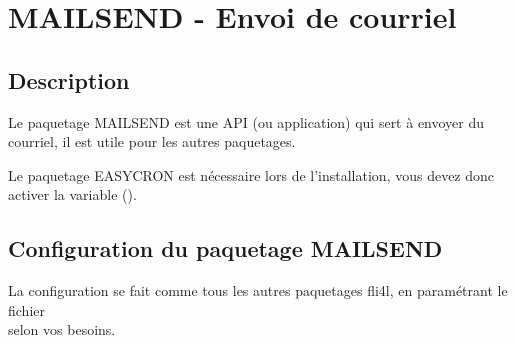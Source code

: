 
\section {MAILSEND - Envoi de courriel}

\subsection {Description}

    Le paquetage MAILSEND est une API (ou application) qui sert à envoyer du courriel,
	il est utile pour les autres paquetages.

    Le paquetage EASYCRON est nécessaire lors de l'installation, vous devez donc activer
	la variable ().

\subsection {Configuration du paquetage MAILSEND}

    La configuration se fait comme tous les autres paquetages fli4l, en paramétrant
	le fichier\\
	 selon vos besoins.

